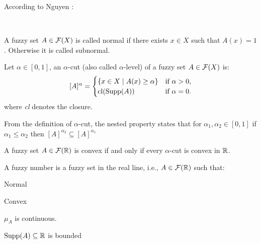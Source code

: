 According to Nguyen \cite{NGUYEN1978}:
 
\\



\begin{definition}
    A fuzzy set $A\in \mathcal{F}(X)$ is called normal if there exists $x\in X$ such that $A(x)=1$. Otherwise it is called subnormal.
\end{definition}

\begin{definition}
    Let $\alpha \in [0,1]$, an $\alpha$-cut (also called $\alpha$-level) of a fuzzy set \( A \in \mathcal{F}(X)\) is:
    \[
    [A]^\alpha =
    \begin{cases}
    \{x \in X \mid A(x)\geq \alpha\} & \text{if } \alpha > 0, \\
    \textnormal{cl}(\textnormal{Supp}(A)) & \text{if } \alpha = 0.
    \end{cases}
    \]
    where \textit{cl} denotes the closure.
\end{definition}

\begin{remark}
    From the definition of $\alpha$-cut, the nested property states that for
    $\alpha_1, \alpha_2 \in [0,1]$ if $\alpha_1\leq \alpha_2$ then $[A]^{\alpha_2}\subseteq [A]^{\alpha_1}$
\end{remark}

\begin{definition}[Convexity] A fuzzy set $A\in \mathcal{F}(\mathbb{R})$ is convex if and only if every $\alpha$-cut is convex in $\mathbb{R}$.
    
\end{definition}

\begin{definition}
    A fuzzy number is a fuzzy set in the real line, i.e., $A\in \mathcal{F}(\mathbb{R})$ such that:\vspace{-0.9em}
    \begin{romanenum}
        \item Normal\vspace{-0.5em}
        \item Convex\vspace{-0.5em}
        \item $\mu_A$ is continuous.\vspace{-0.5em}
        \item $\textnormal{Supp}(A)\subseteq\mathbb{R}$ is bounded
    \end{romanenum}
    
\end{definition}

